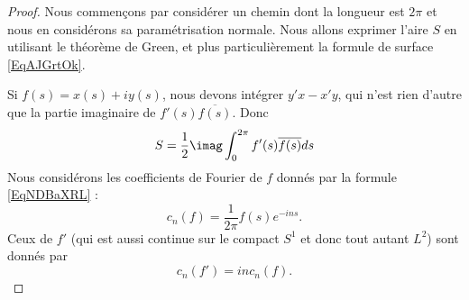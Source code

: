\begin{proof}
    Nous commençons par considérer un chemin dont la longueur est \( 2\pi\) et nous en considérons sa paramétrisation normale. Nous allons exprimer l'aire \( S\) en utilisant le théorème de Green, et plus particulièrement la formule de surface \eqref{EqAJGrtOk}.

    Si \( f(s)=x(s)+iy(s)\), nous devons intégrer \( y'x-x'y\), qui n'est rien d'autre que la partie imaginaire de \( f'(s)\overline{ f(s) }\). Donc
    \begin{equation}    \label{EqCSWKbPX}
        S=\frac{ 1 }{2}\imag\int_0^{2\pi}f'(s)\overline{ f(s) }ds
    \end{equation}
    Nous considérons les coefficients de Fourier de \( f\) donnés par la formule \eqref{EqNDBaXRL} :
    \begin{equation}
        c_n(f)=\frac{1}{ 2\pi }f(s) e^{-ins}.
    \end{equation}
    Ceux de \( f'\) (qui est aussi continue sur le compact \( S^1\) et donc tout autant \( L^2\)) sont donnés par
    \begin{equation}
        c_n(f')=inc_n(f).
    \end{equation}


\end{proof}
